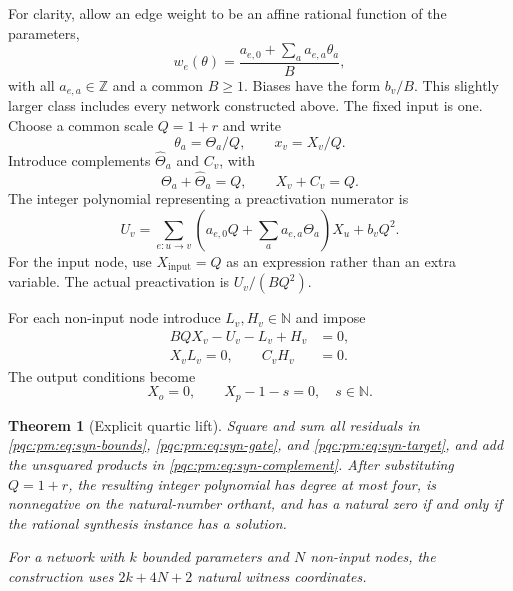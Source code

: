 \documentclass[11pt,letterpaper]{article}
\numberwithin{equation}{section}
\newtheorem{theorem}{Theorem}[section]
\theoremstyle{definition}
\theoremstyle{remark}
\newcommand{\N}{\mathbb N}
\newcommand{\Z}{\mathbb Z}
\begin{document}
For clarity, allow an edge weight to be an affine rational function of the
parameters,
\[
 w_e(\theta)=\frac{a_{e,0}+\sum_a a_{e,a}\theta_a}{B},
\]
with all $a_{e,a}\in\Z$ and a common $B\geq1$. Biases have the form $b_v/B$.
This slightly larger class includes every network constructed above.
The fixed input is one. Choose a common scale $Q=1+r$ and write
\[
 \theta_a=\Theta_a/Q,\qquad x_v=X_v/Q.
\]
Introduce complements $\widehat\Theta_a$ and $C_v$, with
\begin{equation}\label{pqc:pm:eq:syn-bounds}
 \Theta_a+\widehat\Theta_a=Q,\qquad X_v+C_v=Q.
\end{equation}
The integer polynomial representing a preactivation numerator is
\begin{equation}\label{pqc:pm:eq:syn-U}
 U_v=\sum_{e:u\to v}
 \left(a_{e,0}Q+\sum_a a_{e,a}\Theta_a\right)X_u+b_vQ^2.
\end{equation}
For the input node, use $X_{\mathrm{input}}=Q$ as an expression rather than
an extra variable. The actual preactivation is $U_v/(BQ^2)$.

For each non-input node introduce $L_v,H_v\in\N$ and impose
\begin{align}
 BQX_v-U_v-L_v+H_v&=0,\label{pqc:pm:eq:syn-gate}\\
 X_vL_v=0,\qquad C_vH_v&=0.\label{pqc:pm:eq:syn-complement}
\end{align}
The output conditions become
\begin{equation}\label{pqc:pm:eq:syn-target}
 X_o=0,\qquad X_p-1-s=0,\quad s\in\N.
\end{equation}

\begin{theorem}[Explicit quartic lift]\label{pqc:pm:thm:quartic}
Square and sum all residuals in
\eqref{pqc:pm:eq:syn-bounds}, \eqref{pqc:pm:eq:syn-gate}, and \eqref{pqc:pm:eq:syn-target}, and add
the unsquared products in \eqref{pqc:pm:eq:syn-complement}. After substituting
$Q=1+r$, the resulting integer polynomial has degree at most four, is
nonnegative on the natural-number orthant, and has a natural zero if and
only if the rational synthesis instance has a solution.

For a network with $k$ bounded parameters and $N$ non-input nodes, the
construction uses $2k+4N+2$ natural witness coordinates.
\end{theorem}
\end{document}
